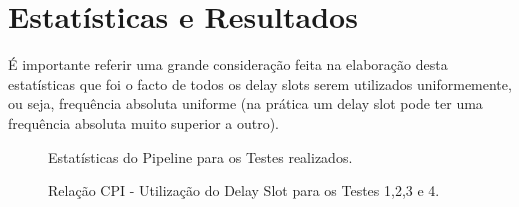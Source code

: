 \chapter{Estatísticas e Resultados}

É importante referir uma grande consideração feita na elaboração desta estatísticas
que foi o facto de todos os delay slots serem utilizados uniformemente, ou seja, frequência absoluta uniforme (na prática um delay slot pode ter uma frequência absoluta muito superior a outro).

\begin{figure}[H]
	\begin{center}
		\caption{Estatísticas do Pipeline para os Testes realizados.}
		\label{tabela}
	\end{center}
\end{figure}

\begin{figure}[H]
	\begin{center}
		\caption{Relação CPI - Utilização do Delay Slot para os Testes 1,2,3 e 4.}
		\label{cpi}
	\end{center}
\end{figure}

